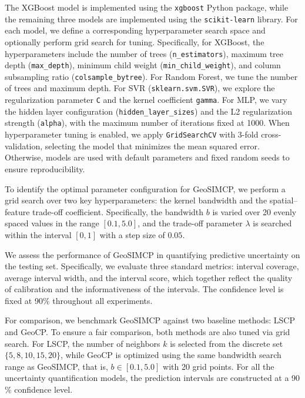 \documentclass[authoryear,preprint,review,12pt]{elsarticle}
\begin{document}
The XGBoost model is implemented using the \texttt{xgboost} Python package, while the remaining three models are implemented using the \texttt{scikit-learn} library. For each model, we define a corresponding hyperparameter search space and optionally perform grid search for tuning. Specifically, for XGBoost, the hyperparameters include the number of trees (\texttt{n\_estimators}), maximum tree depth (\texttt{max\_depth}), minimum child weight (\texttt{min\_child\_weight}), and column subsampling ratio (\texttt{colsample\_bytree}). For Random Forest, we tune the number of trees and maximum depth. For SVR (\texttt{sklearn.svm.SVR}), we explore the regularization parameter \texttt{C} and the kernel coefficient \texttt{gamma}. For MLP, we vary the hidden layer configuration (\texttt{hidden\_layer\_sizes}) and the L2 regularization strength (\texttt{alpha}), with the maximum number of iterations fixed at 1000. When hyperparameter tuning is enabled, we apply \texttt{GridSearchCV} with 3-fold cross-validation, selecting the model that minimizes the mean squared error. Otherwise, models are used with default parameters and fixed random seeds to ensure reproducibility.

To identify the optimal parameter configuration for GeoSIMCP, we perform a grid search over two key hyperparameters: the kernel bandwidth and the spatial–feature trade-off coefficient. Specifically, the bandwidth $b$ is varied over 20 evenly spaced values in the range $[0.1, 5.0]$, and the trade-off parameter $\lambda$ is searched within the interval $[0, 1]$ with a step size of $0.05$.

We assess the performance of GeoSIMCP in quantifying predictive uncertainty on the testing set. Specifically, we evaluate three standard metrics: interval coverage, average interval width, and the interval score, which together reflect the quality of calibration and the informativeness of the intervals. The confidence level is fixed at 90\% throughout all experiments.


For comparison, we benchmark GeoSIMCP against two baseline methods: LSCP and GeoCP. To ensure a fair comparison, both methods are also tuned via grid search. For LSCP, the number of neighbors $k$ is selected from the discrete set $\{5, 8, 10, 15, 20\}$, while GeoCP is optimized using the same bandwidth search range as GeoSIMCP, that is, $b \in [0.1, 5.0]$ with 20 grid points. For all the uncertainty quantification models, the prediction intervals are constructed at a 90 \% confidence level.
\end{document}
